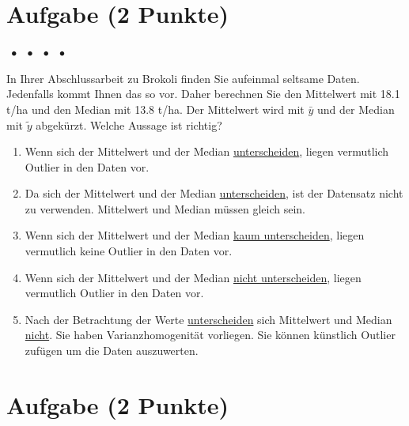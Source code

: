 \documentclass[a4paper, 9pt]{scrartcl}\usepackage[]{graphicx}\usepackage[]{xcolor}
\begin{document}
{\section{Aufgabe \hfill (2 Punkte)}

\ifcollection
\begin{flushright}
\tiny\vspace{-2Ex}
\textbf{\examinhaltstart}
\exammodulemathstat $\;\bullet$
\exammodulestat $\;\bullet$
\exammodulestatbbv $\;\bullet$
\exammodulestatversuch $\;\bullet$
\exammodulebiostat
\vspace{-1Ex}
\end{flushright}
\fi




In Ihrer Abschlussarbeit zu Brokoli finden Sie aufeinmal seltsame Daten. Jedenfalls kommt Ihnen das so vor. Daher berechnen Sie den Mittelwert mit 18.1 t/ha und den Median mit 13.8 t/ha. Der Mittelwert wird mit $\bar{y}$ und der Median mit $\tilde{y}$ abgekürzt. Welche Aussage ist richtig?



\begin{enumerate}
\item [\textbf{A} \msquare] Wenn sich der Mittelwert und der Median \underline{unterscheiden}, liegen vermutlich Outlier in den Daten vor.
\item [\textbf{B} \msquare] Da sich der Mittelwert und der Median \underline{unterscheiden}, ist der Datensatz nicht zu verwenden. Mittelwert und Median müssen gleich sein.
\item [\textbf{C} \msquare] Wenn sich der Mittelwert und der Median \underline{kaum unterscheiden}, liegen vermutlich keine Outlier in den Daten vor.
\item [\textbf{D} \msquare] Wenn sich der Mittelwert und der Median \underline{nicht unterscheiden}, liegen vermutlich Outlier in den Daten vor.
\item [\textbf{E} \msquare] Nach der Betrachtung der Werte \underline{unterscheiden} sich Mittelwert und Median \underline{nicht}. Sie haben Varianzhomogenität vorliegen. Sie können künstlich Outlier zufügen um die Daten auszuwerten.
\end{enumerate} 

\section{Aufgabe \hfill (2 Punkte)}

}
\end{document}
